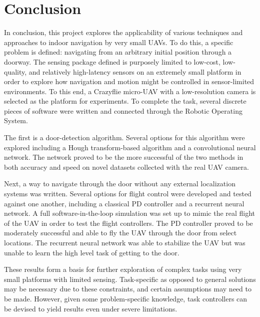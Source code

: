 \documentclass[12pt]{article}
\begin{document}
\section{Conclusion}
In conclusion, this project explores the applicability of various techniques and approaches to indoor navigation by very small UAVs. To do this, a specific problem is defined: navigating from an arbitrary initial position through a doorway. The sensing package defined is purposely limited to low-cost, low-quality, and relatively high-latency sensors on an extremely small platform in order to explore how navigation and motion might be controlled in sensor-limited environments. To this end, a Crazyflie micro-UAV with a low-resolution camera is selected as the platform for experiments. To complete the task, several discrete pieces of software were written and connected through the Robotic Operating System. 

The first is a door-detection algorithm. Several options for this algorithm were explored including a Hough transform-based algorithm and a convolutional neural network. The network proved to be the more successful of the two methods in both accuracy and speed on novel datasets collected with the real UAV camera. 

Next, a way to navigate through the door without any external localization systems was written. Several options for flight control were developed and tested against one another, including a classical PD controller and a recurrent neural network. A full software-in-the-loop simulation was set up to mimic the real flight of the UAV in order to test the flight controllers. The PD controller proved to be moderately successful and able to fly the UAV through the door from select locations. The recurrent neural network was able to stabilize the UAV but was unable to learn the high level task of getting to the door. 

These results form a basis for further exploration of complex tasks using very small platforms with limited sensing. Task-specific as opposed to general solutions may be necessary due to these constraints, and certain assumptions may need to be made. However, given some problem-specific knowledge, task controllers can be devised to yield results even under severe limitations. 


\end{document}
